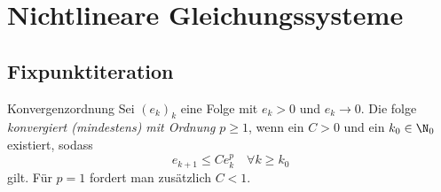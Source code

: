 \section{Nichtlineare Gleichungssysteme}
\subsection{Fixpunktiteration}
\begin{karte}{Konvergenzordnung}
    Sei \( (e_k)_k \) eine Folge 
    mit \(e_k > 0 \) und \(e_k \rightarrow 0\).
    Die folge \textit{konvergiert (mindestens) mit Ordnung } \(p \geq 1\), 
    wenn ein \(C > 0\) und ein \(k_0 \in \N_0\) existiert, sodass 
    \[ e_{k+1} \leq C e_k^p \quad \forall k\geq k_0 \]
    gilt. Für \(p = 1\) fordert man zusätzlich \(C < 1\).
\end{karte}